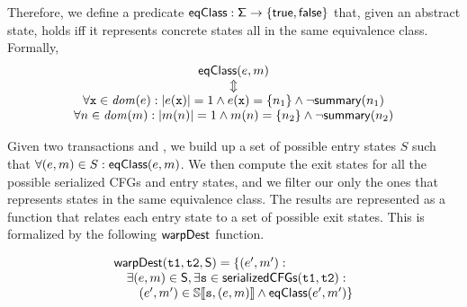 Therefore, we define a predicate $\mathsf{eqClass} : \mathsf{\Sigma} \to \{\mathsf{true}, \mathsf{false}\}$ that, given an abstract state, holds iff it represents concrete states all in the same equivalence class. Formally,
\[
\begin{array}{c}
\mathsf{eqClass}(e, m)\\
\Updownarrow\\
\forall \mathtt{x} \in \mathit{dom}(e) : |e(\mathtt{x})|=1 \land e(\mathtt{x})=\{n_1\} \land \neg \mathsf{summary}(n_1)\\
\forall n \in \mathit{dom}(m) : |m(n)|=1 \land m(n)=\{n_2\} \land \neg \mathsf{summary}(n_2)\\
\end{array}
\]


Given two transactions  and , we build up a set of possible entry states $S$ such that $\forall (e, m) \in S : \mathsf{eqClass}(e, m)$. We then compute the exit states for all the possible serialized CFGs and entry states, and we filter our only the ones that represents states in the same equivalence class. The results are represented as a function that relates each entry state to a set of possible exit states. This is formalized by the following $\mathsf{warpDest}$ function.


\[
\begin{array}{l}
\mathsf{warpDest}(\mathtt{t1}, \mathtt{t2}, \mathsf{S}) =\{(e', m'):\\
\hspace{10pt} \exists (e, m) \in \mathsf{S}, \exists \mathtt{s} \in \mathsf{serializedCFGs}(\mathtt{t1}, \mathtt{t2}) :\\
\hspace{20pt} (e', m') \in \mathbb{S}\llbracket \mathtt{s}, (e, m) \rrbracket \land \mathsf{eqClass}(e', m')\}\\
\end{array}
\]


\newcommand\ts{\bar{t}}

%
%
%


